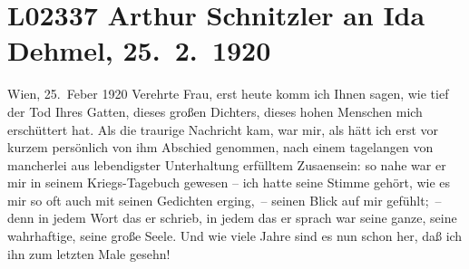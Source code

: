 

\section[Arthur Schnitzler an Ida Dehmel, 25. 2. 1920]{L02337 Arthur Schnitzler an Ida Dehmel, 25. 2. 1920}
\nopagebreak{}
\rehead{ }\normalsize\beginnumbering{}
\toendnotes[C]{\smallbreak\pagebreak[2]}
\toendnotes[C]{\smallbreak}
\toendnotes[C]{\smallbreak}
\pstart
           \raggedleft{}{\pb}Wien, 25. Feber 1920\pend
           \vspace{0.5em}
\pstart
           Verehrte Frau, erst heute komm ich Ihnen sagen, wie tief der Tod
               Ihres Gatten, dieses großen Dichters, dieses
               hohen Menschen mich erschüttert hat. Als die traurige Nachricht kam, war mir, als
               hätt ich erst vor kurzem persönlich von ihm Abschied genommen, nach einem tagelangen
               von mancherlei aus lebendigster Unterhaltung erfülltem Zusa{\geminationm}ensein: so nahe war er mir in seinem Kriegs-{\pb}Tagebuch
               gewesen – ich hatte seine Stimme gehört, wie es mir so oft auch mit seinen Gedichten
               erging, – seinen Blick auf mir gefühlt; – denn in jedem Wort das er schrieb, in jedem
               das er sprach war seine ganze, seine wahrhaftige, seine große Seele. Und wie viele
               Jahre sind es nun schon her, daß ich ihn zum letzten Male gesehn!\pend
           
